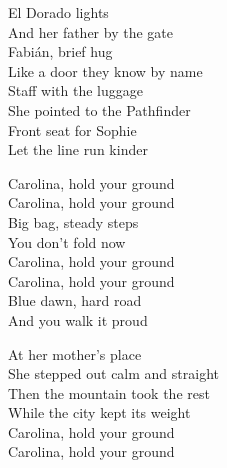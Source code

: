 \begin{lyrics}
El Dorado lights\\
And her father by the gate\\
Fabián, brief hug\\
Like a door they know by name\\
Staff with the luggage\\
She pointed to the Pathfinder\\
Front seat for Sophie\\
Let the line run kinder

Carolina, hold your ground\\
Carolina, hold your ground\\
Big bag, steady steps\\
You don’t fold now\\
Carolina, hold your ground\\
Carolina, hold your ground\\
Blue dawn, hard road\\
And you walk it proud

At her mother’s place\\
She stepped out calm and straight\\
Then the mountain took the rest\\
While the city kept its weight\\
Carolina, hold your ground\\
Carolina, hold your ground
\end{lyrics}

